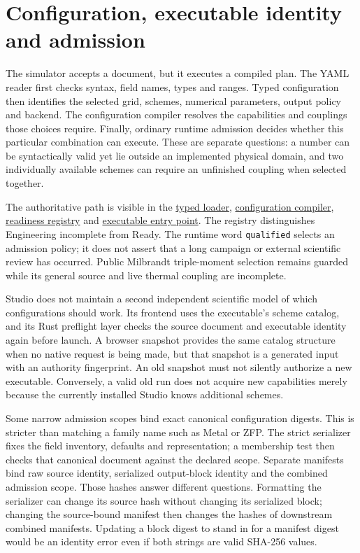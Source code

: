 \section{Configuration, executable identity and admission}
\label{architecture-admission}

The simulator accepts a document, but it executes a compiled plan. The YAML
reader first checks syntax, field names, types and ranges. Typed configuration
then identifies the selected grid, schemes, numerical parameters, output
policy and backend. The configuration compiler resolves the capabilities and
couplings those choices require. Finally, ordinary runtime admission decides
whether this particular combination can execute. These are separate questions:
a number can be syntactically valid yet lie outside an implemented physical
domain, and two individually available schemes can require an unfinished
coupling when selected together.

The authoritative path is visible in the
\href{../src/init/config/v1_loader.cpp}{typed loader},
\href{../src/core/runtime/configuration_compiler.hpp}{configuration compiler},
\href{../src/core/runtime/readiness.cpp}{readiness registry} and
\href{../src/core/runtime/nimbus_sim.cpp}{executable entry point}.
The registry distinguishes Engineering incomplete from Ready. The runtime
word \texttt{qualified} selects an admission policy; it does not assert that
a long campaign or external scientific review has occurred. Public Milbrandt
triple-moment selection remains guarded while its general source and live
thermal coupling are incomplete.

Studio does not maintain a second independent scientific model of which
configurations should work. Its frontend uses the executable's scheme catalog,
and its Rust preflight layer checks the source document and executable identity
again before launch. A browser snapshot provides the same catalog structure
when no native request is being made, but that snapshot is a generated input
with an authority fingerprint. An old snapshot must not silently authorize a
new executable. Conversely, a valid old run does not acquire new capabilities
merely because the currently installed Studio knows additional schemes.

Some narrow admission scopes bind exact canonical configuration digests. This
is stricter than matching a family name such as Metal or ZFP. The strict
serializer fixes the field inventory, defaults and representation; a membership
test then checks that canonical document against the declared scope. Separate
manifests bind raw source identity, serialized output-block identity and the
combined admission scope. Those hashes answer different questions. Formatting
the serializer can change its source hash without changing its serialized
block; changing the source-bound manifest then changes the hashes of downstream
combined manifests. Updating a block digest to stand in for a manifest digest
would be an identity error even if both strings are valid SHA-256 values.

